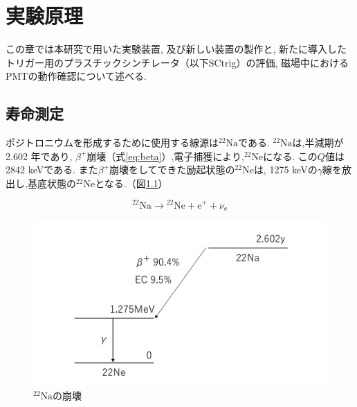 \chapter{実験原理}
\label{apparatus}


この章では本研究で用いた実験装置,
及び新しい装置の製作と,
新たに導入したトリガー用のプラスチックシンチレータ（以下SCtrig）の評価,
磁場中におけるPMTの動作確認について述べる.


\section{寿命測定}\label{life_measurement}

ポジトロニウムを形成するために使用する線源は$\mathrm{^{22}Na}$である.
$\mathrm{^{22}Na}$は,半減期が2.602 年であり,
$\beta^{+}$崩壊（式\ref{eq:beta}）,電子捕獲により,$\mathrm{^{22}Ne}$になる.
この$Q$値は2842 keVである.\cite{ToRI}
また$\beta^{+}$崩壊をしてできた励起状態の$\mathrm{^{22}Ne}$は,
1275 keVの$\gamma$線を放出し,基底状態の$\mathrm{^{22}Ne}$となる.（図\ref{fig:na}）

\begin{equation}
\mathrm{^{22}Na} \to \mathrm{^{22}Ne} + \mathrm{e^{+}} + \nu_{\mathrm{e}}
\label{eq:beta}
\end{equation}

\begin{figure}[H]
\centering
\includegraphics[keepaspectratio,scale=0.4]{fig/ybm/na.pdf}
\caption{$\mathrm{^{22}Na}$の崩壊\cite{ToI}}
\label{fig:na}
\end{figure}

